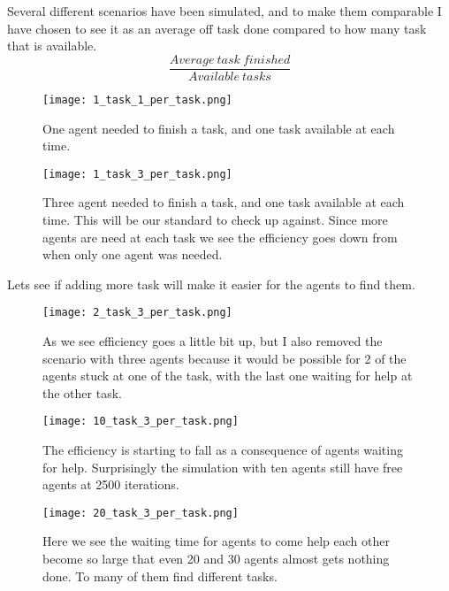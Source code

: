 \documentclass[a4paper]{article}
\begin{document}
Several different scenarios have been simulated, and to make them comparable I have chosen to see it as an average off task done compared to how many task that is available. 
\begin{equation}
\dfrac{Average\: task\: finished}{Available\: tasks}
\end{equation}





\begin{figure}[H]
  \centering
  \texttt{[image: 1\_task\_1\_per\_task.png]}
  \caption{One agent needed to finish a task, and one task available at each time.}
  \label{1_task_1_per_task}
\end{figure}

\begin{figure}[H]
  \centering
  \texttt{[image: 1\_task\_3\_per\_task.png]}
  \caption{Three agent needed to finish a task, and one task available at each time. This will be our standard to check up against. Since more agents are need at each task we see the efficiency goes down from when only one agent was needed.}
  \label{1_task_3_per_task}
\end{figure}


Lets see if adding more task will make it easier for the agents to find them.

\begin{figure}[H]
  \centering
  \texttt{[image: 2\_task\_3\_per\_task.png]}
  \caption{As we see efficiency goes a little bit up, but I also removed the scenario with three agents because it would be possible for 2 of the agents stuck at one of the task, with the last one waiting for help at the other task.}
  \label{2_task_3_per_task}
\end{figure}



\begin{figure}[H]
  \centering
  \texttt{[image: 10\_task\_3\_per\_task.png]}
  \caption{The efficiency is starting to fall as a consequence of agents waiting for help. Surprisingly the simulation with ten agents still have free agents at 2500 iterations.}
  \label{10_task_3_per_task}
\end{figure}


\begin{figure}[H]
  \centering
  \texttt{[image: 20\_task\_3\_per\_task.png]}
  \caption{Here we see the waiting time for agents to come help each other become so large that even 20 and 30 agents almost gets nothing done. To many of them find different tasks.}
  \label{20_task_3_per_task}
\end{figure}
\end{document}
